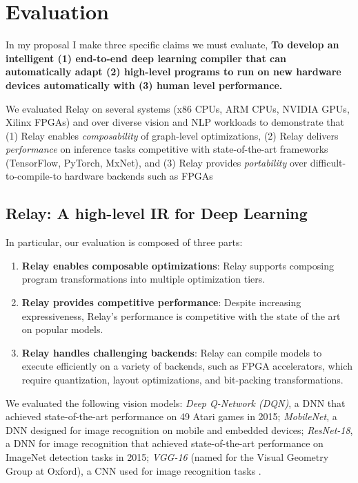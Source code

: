 \section{Evaluation}
\label{sec:eval}


In my proposal I make three specific claims we must evaluate,
\textbf{To develop an intelligent (1) end-to-end deep learning compiler that can
automatically adapt (2) high-level programs to run on new hardware devices automatically
with (3) human level performance.}

We evaluated Relay on several systems (x86 CPUs, ARM CPUs, NVIDIA GPUs, Xilinx FPGAs) and over
  diverse vision and NLP workloads to demonstrate that (1) Relay enables \emph{composability} of
  graph-level optimizations, (2) Relay delivers \emph{performance} on inference tasks competitive
  with state-of-the-art frameworks (TensorFlow, PyTorch, MxNet), and (3) Relay provides
  \emph{portability} over difficult-to-compile-to hardware backends such as FPGAs

\subsection{Relay: A high-level IR for Deep Learning}
  In particular, our evaluation is composed of three parts:
  \begin{enumerate}
    \item \textbf{Relay enables composable optimizations}: Relay
      supports composing program transformations into multiple optimization tiers.
    \item \textbf{Relay provides competitive performance}: Despite increasing
      expressiveness, Relay's performance is competitive with the
      state of the art on popular models.
    \item \textbf{Relay handles challenging backends}: Relay can compile
      models to execute efficiently on a variety of
      backends, such as FPGA accelerators, which require quantization, layout
      optimizations, and bit-packing transformations.
  \end{enumerate}

  We evaluated the following vision models:
    \textit{Deep Q-Network (DQN)}, a DNN that achieved state-of-the-art performance
    on 49 Atari games in 2015;
    \textit{MobileNet}, a DNN designed for image recognition on mobile and
    embedded devices;
    \textit{ResNet-18}, a DNN for image recognition that achieved state-of-the-art
    performance on ImageNet detection tasks in 2015;
    \textit{VGG-16} (named for the Visual Geometry Group
    at Oxford), a CNN used for image recognition tasks
    \citep{dqn, mobilenet, resnet, vgg}.


